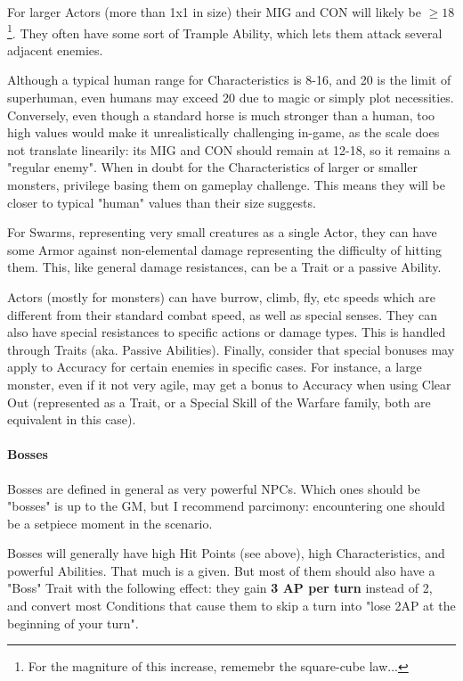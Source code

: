 For larger Actors (more than 1x1 in size) their MIG and CON will likely be $\geq18$\footnote{For the magniture of this increase, rememebr the square-cube law...}. They often have some sort of Trample Ability, which lets them attack several adjacent enemies.

Although a typical human range for Characteristics is 8-16, and 20 is the limit of superhuman, even humans may exceed 20 due to magic or simply plot necessities. Conversely, even though a standard horse is much stronger than a human, too high values would make it unrealistically challenging in-game, as the scale does not translate linearily: its MIG and CON should remain at 12-18, so it remains a "regular enemy". When in doubt for the Characteristics of larger or smaller monsters, privilege basing them on gameplay challenge. This means they will be closer to typical "human" values than their size suggests.

For Swarms, representing very small creatures as a single Actor, they can have some Armor against non-elemental damage representing the difficulty of hitting them. This, like general damage resistances, can be a Trait or a passive Ability.

Actors (mostly for monsters) can have burrow, climb, fly, etc speeds which are different from their standard combat speed, as well as special senses. They can also have special resistances to specific actions or damage types. This is handled through Traits (aka. Passive Abilities). Finally, consider that special bonuses may apply to Accuracy for certain enemies in specific cases. For instance, a large monster, even if it not very agile, may get a bonus to Accuracy when using Clear Out (represented as a Trait, or a Special Skill of the Warfare family, both are equivalent in this case).


\paragraph{Bosses}

Bosses are defined in general as very powerful NPCs. Which ones should be "bosses" is up to the GM, but I recommend parcimony: encountering one should be a setpiece moment in the scenario.

Bosses will generally have high Hit Points (see above), high Characteristics, and powerful Abilities. That much is a given. But most of them should also have a "Boss" Trait with the following effect: they gain \textbf{3 AP per turn} instead of 2, and convert most Conditions that cause them to skip a turn into "lose 2AP at the beginning of your turn". 

